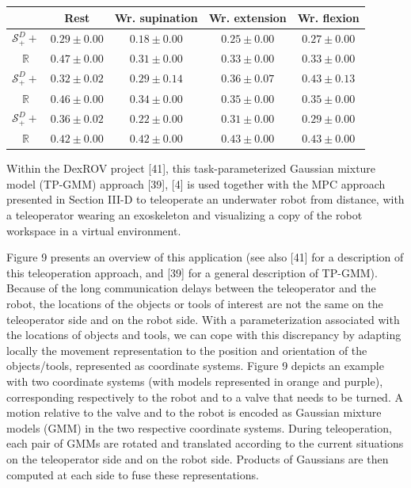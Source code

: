 \documentclass[10pt]{article}
\begin{document}
\begin{center}
\begin{tabular}{c|c|c|c|c|}
 & Rest & Wr. supination & Wr. extension & Wr. flexion \\
\hline
$\mathcal{S}_{+}^{D}+$ & $0.29 \pm 0.00$ & $0.18 \pm 0.00$ & $0.25 \pm 0.00$ & $0.27 \pm 0.00$ \\
$\mathbb{R}$ & $0.47 \pm 0.00$ & $0.31 \pm 0.00$ & $0.33 \pm 0.00$ & $0.33 \pm 0.00$ \\
\hline
$\mathcal{S}_{+}^{D}+$ & $0.32 \pm 0.02$ & $0.29 \pm 0.14$ & $0.36 \pm 0.07$ & $0.43 \pm 0.13$ \\
$\mathbb{R}$ & $0.46 \pm 0.00$ & $0.34 \pm 0.00$ & $0.35 \pm 0.00$ & $0.35 \pm 0.00$ \\
\hline
$\mathcal{S}_{+}^{D}+$ & $0.36 \pm 0.02$ & $0.22 \pm 0.00$ & $0.31 \pm 0.00$ & $0.29 \pm 0.00$ \\
$\mathbb{R}$ & $0.42 \pm 0.00$ & $0.42 \pm 0.00$ & $0.43 \pm 0.00$ & $0.43 \pm 0.00$ \\
\hline
\end{tabular}
\end{center}

Within the DexROV project [41], this task-parameterized Gaussian mixture model (TP-GMM) approach [39], [4] is used together with the MPC approach presented in Section III-D to teleoperate an underwater robot from distance, with a teleoperator wearing an exoskeleton and visualizing a copy of the robot workspace in a virtual environment.

Figure 9 presents an overview of this application (see also [41] for a description of this teleoperation approach, and [39] for a general description of TP-GMM). Because of the long communication delays between the teleoperator and the robot, the locations of the objects or tools of interest are not the same on the teleoperator side and on the robot side. With a parameterization associated with the locations of objects and tools, we can cope with this discrepancy by adapting locally the movement representation to the position and orientation of the objects/tools, represented as coordinate systems. Figure 9 depicts an example with two coordinate systems (with models represented in orange and purple), corresponding respectively to the robot and to a valve that needs to be turned. A motion relative to the valve and to the robot is encoded as Gaussian mixture models (GMM) in the two respective coordinate systems. During teleoperation, each pair of GMMs are rotated and translated according to the current situations on the teleoperator side and on the robot side. Products of Gaussians are then computed at each side to fuse these representations.
\end{document}
